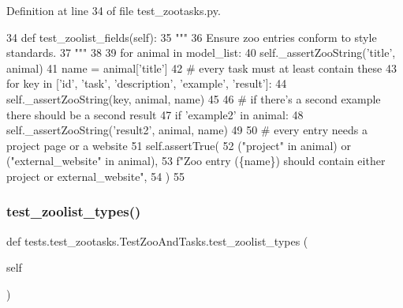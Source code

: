 Definition at line 34 of file test\+\_\+zootasks.\+py.


\begin{DoxyCode}
34     \textcolor{keyword}{def }test\_zoolist\_fields(self):
35         \textcolor{stringliteral}{"""}
36 \textcolor{stringliteral}{        Ensure zoo entries conform to style standards.}
37 \textcolor{stringliteral}{        """}
38 
39         \textcolor{keywordflow}{for} animal \textcolor{keywordflow}{in} model\_list:
40             self.\_assertZooString(\textcolor{stringliteral}{'title'}, animal)
41             name = animal[\textcolor{stringliteral}{'title'}]
42             \textcolor{comment}{# every task must at least contain these}
43             \textcolor{keywordflow}{for} key \textcolor{keywordflow}{in} [\textcolor{stringliteral}{'id'}, \textcolor{stringliteral}{'task'}, \textcolor{stringliteral}{'description'}, \textcolor{stringliteral}{'example'}, \textcolor{stringliteral}{'result'}]:
44                 self.\_assertZooString(key, animal, name)
45 
46             \textcolor{comment}{# if there's a second example there should be a second result}
47             \textcolor{keywordflow}{if} \textcolor{stringliteral}{'example2'} \textcolor{keywordflow}{in} animal:
48                 self.\_assertZooString(\textcolor{stringliteral}{'result2'}, animal, name)
49 
50             \textcolor{comment}{# every entry needs a project page or a website}
51             self.assertTrue(
52                 (\textcolor{stringliteral}{"project"} \textcolor{keywordflow}{in} animal) \textcolor{keywordflow}{or} (\textcolor{stringliteral}{"external\_website"} \textcolor{keywordflow}{in} animal),
53                 f\textcolor{stringliteral}{"Zoo entry (\{name\}) should contain either project or external\_website"},
54             )
55 
\end{DoxyCode}
\mbox{\label{classtests_1_1test__zootasks_1_1TestZooAndTasks_a8d7616fa41ed03322c86a565eedb4e8c}} 
\subsubsection{\texorpdfstring{test\+\_\+zoolist\+\_\+types()}{test\_zoolist\_types()}}
{\footnotesize\ttfamily def tests.\+test\+\_\+zootasks.\+Test\+Zoo\+And\+Tasks.\+test\+\_\+zoolist\+\_\+types (\begin{DoxyParamCaption}\item[{}]{self }\end{DoxyParamCaption})}

